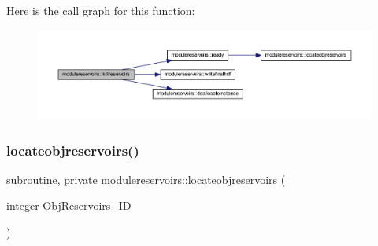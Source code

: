 Here is the call graph for this function\+:\nopagebreak
\begin{figure}[H]
\begin{center}
\leavevmode
\includegraphics[width=350pt]{namespacemodulereservoirs_a7b14b20d3da20267f728eae98a202e5e_cgraph}
\end{center}
\end{figure}
\mbox{\label{namespacemodulereservoirs_a777d3a0c23fa5c2ea11ed589e1d23711}} 
\subsubsection{\texorpdfstring{locateobjreservoirs()}{locateobjreservoirs()}}
{\footnotesize\ttfamily subroutine, private modulereservoirs\+::locateobjreservoirs (\begin{DoxyParamCaption}\item[{integer}]{Obj\+Reservoirs\+\_\+\+ID }\end{DoxyParamCaption})\hspace{0.3cm}{\ttfamily [private]}}

